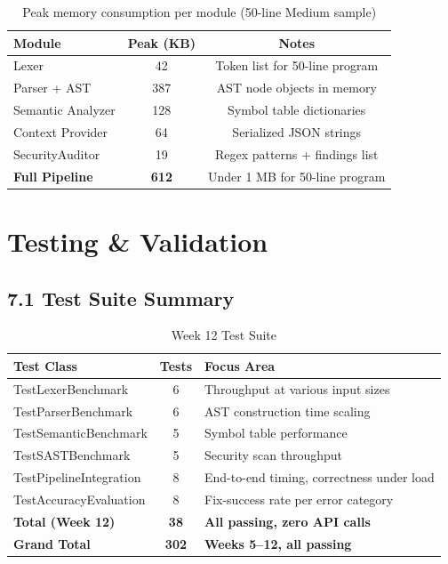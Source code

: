 \documentclass[a4paper,11pt]{article}
\begin{document}
\begin{table}[h]
\centering
\begin{tabularx}{\textwidth}{|l|c|c|}
\hline
\rowcolor{violet!10}
\textbf{Module} & \textbf{Peak (KB)} & \textbf{Notes} \\
\hline
Lexer & 42 & Token list for 50-line program \\
\hline
Parser + AST & 387 & AST node objects in memory \\
\hline
Semantic Analyzer & 128 & Symbol table dictionaries \\
\hline
Context Provider & 64 & Serialized JSON strings \\
\hline
SecurityAuditor & 19 & Regex patterns + findings list \\
\hline
\textbf{Full Pipeline} & \textbf{612} & Under 1 MB for 50-line program \\
\hline
\end{tabularx}
\caption{Peak memory consumption per module (50-line Medium sample)}
\end{table}

\section{Testing \& Validation}

\subsection{7.1 Test Suite Summary}

\begin{table}[h]
\centering
\begin{tabularx}{\textwidth}{|l|c|X|}
\hline
\rowcolor{violet!10}
\textbf{Test Class} & \textbf{Tests} & \textbf{Focus Area} \\
\hline
TestLexerBenchmark & 6 & Throughput at various input sizes \\
\hline
TestParserBenchmark & 6 & AST construction time scaling \\
\hline
TestSemanticBenchmark & 5 & Symbol table performance \\
\hline
TestSASTBenchmark & 5 & Security scan throughput \\
\hline
TestPipelineIntegration & 8 & End-to-end timing, correctness under load \\
\hline
TestAccuracyEvaluation & 8 & Fix-success rate per error category \\
\hline
\textbf{Total (Week 12)} & \textbf{38} & \textbf{All passing, zero API calls} \\
\hline
\textbf{Grand Total} & \textbf{302} & \textbf{Weeks 5--12, all passing} \\
\hline
\end{tabularx}
\caption{Week 12 Test Suite}
\end{table}
\end{document}
